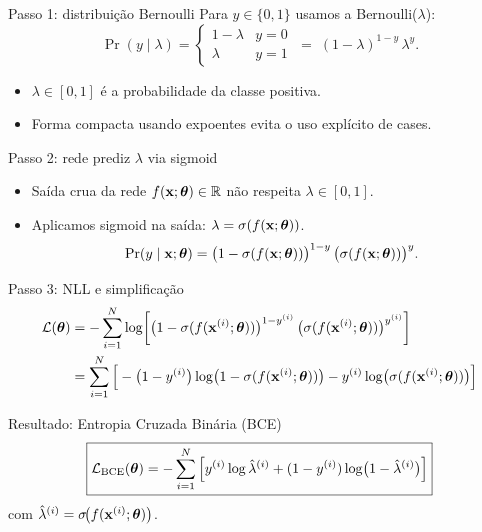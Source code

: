 \documentclass[aspectratio=169,xcolor=dvipsnames]{beamer}
\begin{document}
  \begin{frame}{Passo 1: distribuição Bernoulli}
    Para $y\in\{0,1\}$ usamos a Bernoulli($\lambda$):
    \[
      \Pr(y\mid \lambda) =
        \begin{cases}
          1-\lambda & y=0 \\
          \lambda & y=1
        \end{cases}
        \;=\; (1-\lambda)^{1-y}\,\lambda^{y}.
    \]
    \begin{itemize}
      \item $\lambda\in[0,1]$ é a probabilidade da classe positiva.
      \item Forma compacta usando expoentes evita o uso explícito de cases.
    \end{itemize}
  \end{frame}

  \begin{frame}{Passo 2: rede prediz $\lambda$ via sigmoid}
    \begin{itemize}
      \item Saída crua da rede $f(\mathbf{x};\bm{\theta})\in\mathbb{R}$ não respeita $\lambda\in[0,1]$.
      \item Aplicamos sigmoid na saída: $\lambda = \sigma(f(\mathbf{x};\bm{\theta}))$.
      \[
        \Pr(y\mid \mathbf{x};\bm{\theta}) =
          \big(1-\sigma(f(\mathbf{x};\bm{\theta}))\big)^{1-y}\,
          \big(\sigma(f(\mathbf{x};\bm{\theta}))\big)^{y}.
      \]
    \end{itemize}
  \end{frame}

  \begin{frame}{Passo 3: NLL e simplificação}
    \begin{align*}
      \mathcal{L}(\bm{\theta})
        &= -\sum_{i=1}^{N}\log\!\left[\big(1-\sigma(f(\mathbf{x}^{(i)};\bm{\theta}))\big)^{1-y^{(i)}}\,
                                       \big(\sigma(f(\mathbf{x}^{(i)};\bm{\theta}))\big)^{y^{(i)}}\right] \\
        &= \sum_{i=1}^{N}\Big[-\big(1-y^{(i)}\big)\log\!\big(1-\sigma(f(\mathbf{x}^{(i)};\bm{\theta}))\big)
                              -y^{(i)}\log\!\big(\sigma(f(\mathbf{x}^{(i)};\bm{\theta}))\big)\Big]
    \end{align*}
    \begin{block}{Resultado: Entropia Cruzada Binária (BCE)}
      \[
        \boxed{\mathcal{L}_{\text{BCE}}(\bm{\theta}) = -\sum_{i=1}^{N}
          \Big[ y^{(i)}\log\hat\lambda^{(i)} + (1-y^{(i)})\log\!\big(1-\hat\lambda^{(i)}\big) \Big]}
      \]
      \centering com $\hat\lambda^{(i)} = \sigma\!\big(f(\mathbf{x}^{(i)};\bm{\theta})\big)$.
    \end{block}
  \end{frame}
\end{document}
